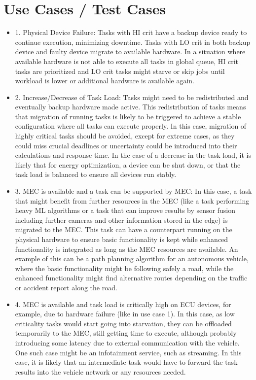 \section{Use Cases / Test Cases}\label{section:approachusecases}

\begin{itemize}
	\item 1. Physical Device Failure: Tasks with HI crit have a backup device ready to continue execution, minimizing downtime. Tasks with LO crit in both backup device and faulty device migrate to available hardware. In a situation where available hardware is not able to execute all tasks in global queue, HI crit tasks are prioritized and LO crit tasks might starve or skip jobs until workload is lower or additional hardware is available again.
	\item 2. Increase/Decrease of Task Load: Tasks might need to be redistributed and eventually backup hardware made active. This redistribution of tasks means that migration of running tasks is likely to be triggered to achieve a stable configuration where all tasks can execute properly. In this case, migration of highly critical tasks should be avoided, except for extreme cases, as they could miss crucial deadlines or uncertainty could be introduced into their calculations and response time. In the case of a decrease in the task load, it is likely that for energy optimization, a device can be shut down, or that the task load is balanced to ensure all devices run stably.
	\item 3. MEC is available and a task can be supported by MEC: In this case, a task that might benefit from further resources in the MEC (like a task performing heavy ML algorithms or a task that can improve results by  sensor fusion including further cameras and other information stored in the edge) is migrated to the MEC. This task can have a counterpart running on the physical hardware to ensure basic functionality is kept while enhanced functionality is integrated as long as the MEC resources are available. An example of this can be a path planning algorithm for an autonomous vehicle, where the basic functionality might be following safely a road, while the enhanced functionality might find alternative routes depending on the traffic or accident report along the road.
	\item 4. MEC is available and task load is critically high on ECU devices, for example, due to hardware failure (like in use case 1). In this case, as low criticality tasks would start going into starvation, they can be offloaded temporarily to the MEC, still getting time to execute, although probably introducing some latency due to external communication with the vehicle. One such case might be an infotainment service, such as streaming. In this case, it is likely that an intermediate task would have to forward the task results into the vehicle network or any resources needed.
\end{itemize}

	

